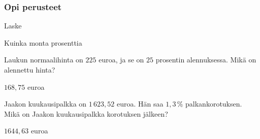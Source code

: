 \begin{tehtavasivu}



\subsubsection*{Opi perusteet}

\begin{tehtava}
    Laske
    \begin{vastaus}
    \end{vastaus}
\end{tehtava}

\begin{tehtava}
    Kuinka monta prosenttia
    \begin{vastaus}
    \end{vastaus}
\end{tehtava}


\begin{tehtava}
    Laukun normaalihinta on $225$ euroa, ja se on $25$ prosentin alennuksessa.
    Mikä on alennettu hinta?
    \begin{vastaus}
        $168,75$ euroa
    \end{vastaus}
\end{tehtava}

\begin{tehtava}
    Jaakon kuukausipalkka on $1\,623,52$ euroa. Hän saa $1,3\,\%$ palkankorotuksen. Mikä on Jaakon kuukausipalkka korotuksen jälkeen?
    \begin{vastaus}
        $1644,63$ euroa
    \end{vastaus}
\end{tehtava}


\end{tehtavasivu}
